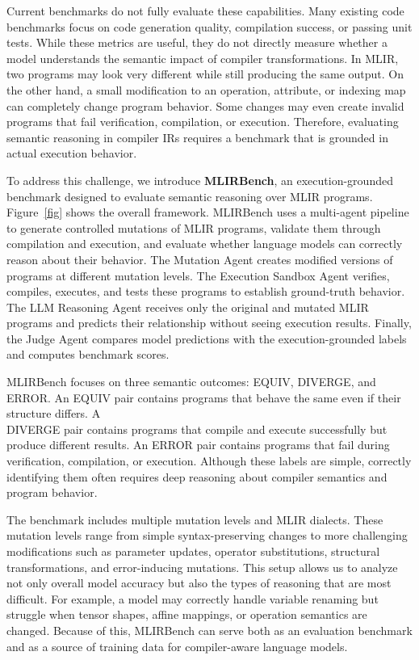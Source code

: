 \documentclass[sigplan,screen,review,anonymous]{acmart}
\begin{document}
Current benchmarks do not fully evaluate these capabilities. Many existing code benchmarks focus on code generation quality, compilation success, or passing unit tests. While these metrics are useful, they do not directly measure whether a model understands the semantic impact of compiler transformations. In MLIR, two programs may look very different while still producing the same output. On the other hand, a small modification to an operation, attribute, or indexing map can completely change program behavior. Some changes may even create invalid programs that fail verification, compilation, or execution. Therefore, evaluating semantic reasoning in compiler IRs requires a benchmark that is grounded in actual execution behavior.

To address this challenge, we introduce \textbf{MLIRBench}, an execution-grounded benchmark designed to evaluate semantic reasoning over MLIR programs. Figure~\ref{fig} shows the overall framework. MLIRBench uses a multi-agent pipeline to generate controlled mutations of MLIR programs, validate them through compilation and execution, and evaluate whether language models can correctly reason about their behavior. The Mutation Agent creates modified versions of programs at different mutation levels. The Execution Sandbox Agent verifies, compiles, executes, and tests these programs to establish ground-truth behavior. The LLM Reasoning Agent receives only the original and mutated MLIR programs and predicts their relationship without seeing execution results. Finally, the Judge Agent compares model predictions with the execution-grounded labels and computes benchmark scores.

MLIRBench focuses on three semantic outcomes: \textsc{EQUIV}, \textsc{DIVERGE}, and \textsc{ERROR}. An \textsc{EQUIV} pair contains programs that behave the same even if their structure differs. A \\ \textsc{DIVERGE} pair contains programs that compile and execute successfully but produce different results. An \textsc{ERROR} pair contains programs that fail during verification, compilation, or execution. Although these labels are simple, correctly identifying them often requires deep reasoning about compiler semantics and program behavior.

The benchmark includes multiple mutation levels and MLIR dialects. These mutation levels range from simple syntax-preserving changes to more challenging modifications such as parameter updates, operator substitutions, structural transformations, and error-inducing mutations. This setup allows us to analyze not only overall model accuracy but also the types of reasoning that are most difficult. For example, a model may correctly handle variable renaming but struggle when tensor shapes, affine mappings, or operation semantics are changed. Because of this, MLIRBench can serve both as an evaluation benchmark and as a source of training data for compiler-aware language models.
\end{document}
